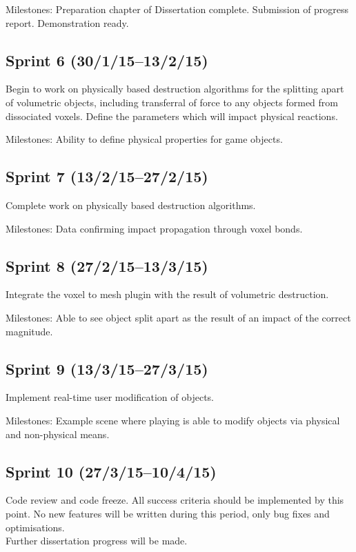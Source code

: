 Milestones: Preparation chapter of Dissertation complete. Submission of progress report. Demonstration ready.


\subsection*{Sprint 6 (30/1/15--13/2/15)}

Begin to work on physically based destruction algorithms for the splitting apart of volumetric objects, including transferral of force to any objects formed from dissociated voxels. Define the parameters which will impact physical reactions.

Milestones: Ability to define physical properties for game objects.

\clearpage
\subsection*{Sprint 7 (13/2/15--27/2/15)}

Complete work on physically based destruction algorithms.

Milestones: Data confirming impact propagation through voxel bonds.

\subsection*{Sprint 8 (27/2/15--13/3/15)}

Integrate the voxel to mesh plugin with the result of volumetric destruction.

Milestones: Able to see object split apart as the result of an impact of the correct magnitude.


\subsection*{Sprint 9 (13/3/15--27/3/15)}

Implement real-time user modification of objects.

Milestones: Example scene where playing is able to modify objects via physical and non-physical means.


\subsection*{Sprint 10 (27/3/15--10/4/15)}

Code review and code freeze. All success criteria should be implemented by this point. No new features will be written during this period, only bug fixes and optimisations.\\
Further dissertation progress will be made.


